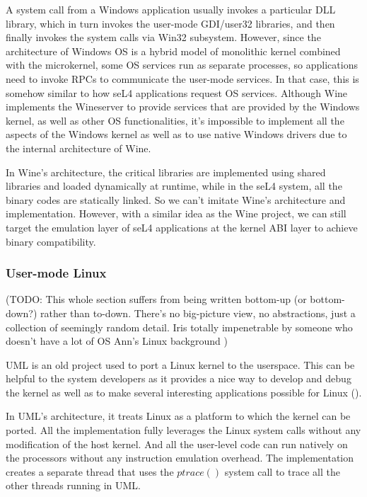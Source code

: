 A system call from a Windows application usually invokes a particular DLL library, which in turn invokes the user-mode GDI/user32 libraries, and then finally invokes the system calls via Win32 subsystem. However, since the architecture of Windows OS is a hybrid model of monolithic kernel combined with the microkernel, some OS services run as separate processes, so applications need to invoke RPCs to communicate the user-mode services. In that case, this is somehow similar to how seL4 applications request OS services. Although Wine implements the Wineserver to provide services that are provided by the Windows kernel, as well as other OS functionalities, it's impossible to implement all the aspects of the Windows kernel as well as to use native Windows drivers due to the internal architecture of Wine. 

In Wine's architecture, the critical libraries are implemented using shared libraries and loaded dynamically at runtime, while in the seL4 system, all the binary codes are statically linked. So we can't imitate Wine's architecture and implementation. However, with a similar idea as the Wine project, we can still target the emulation layer of seL4 applications at the kernel ABI layer to achieve binary compatibility.

\subsubsection{User-mode Linux}

(TODO: This whole section suffers from being written bottom-up (or bottom-down?) rather than to-down. There's no big-picture view, no abstractions, just a collection of seemingly random detail. Iris totally impenetrable by someone who doesn't have a lot of OS Ann's Linux background )

UML is an old project used to port a Linux kernel to the userspace. This can be helpful to the system developers as it provides a nice way to develop and debug the kernel as well as to make several interesting applications possible for Linux (\cite{JD06}). 

In UML's architecture, it treats Linux as a platform to which the kernel can be ported. All the implementation fully leverages the Linux system calls without any modification of the host kernel. And all the user-level code can run natively on the processors without any instruction emulation overhead. The implementation creates a separate thread that uses the $ptrace()$ system call to trace all the other threads running in UML. 


